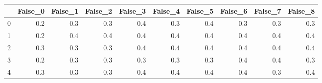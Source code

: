 \begin{tabular}{lrrrrrrrrr}
\toprule
{} &  False\_0 &  False\_1 &  False\_2 &  False\_3 &  False\_4 &  False\_5 &  False\_6 &  False\_7 &  False\_8 \\ \hline
\midrule
0 &      0.2 &      0.3 &      0.3 &      0.4 &      0.3 &      0.4 &      0.3 &      0.3 &      0.3 \\ \hline
1 &      0.2 &      0.4 &      0.4 &      0.4 &      0.4 &      0.4 &      0.4 &      0.4 &      0.4 \\ \hline
2 &      0.3 &      0.3 &      0.3 &      0.4 &      0.4 &      0.4 &      0.4 &      0.4 &      0.4 \\ \hline
3 &      0.2 &      0.3 &      0.3 &      0.3 &      0.3 &      0.3 &      0.4 &      0.4 &      0.3 \\ \hline
4 &      0.3 &      0.3 &      0.3 &      0.4 &      0.4 &      0.4 &      0.4 &      0.3 &      0.4 \\ \hline
\bottomrule
\end{tabular}

